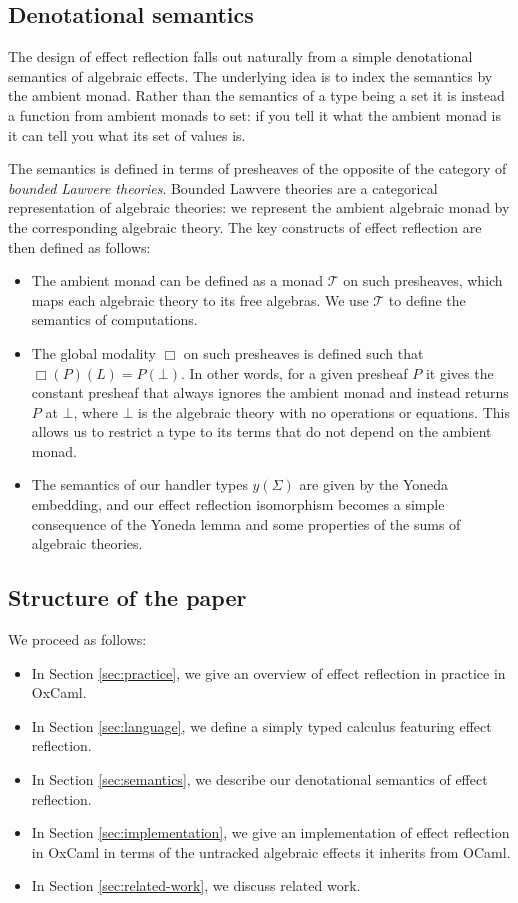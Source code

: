 \documentclass[acmsmall, screen, nonacm]{acmart}
\theoremstyle{definition}
\newcommand{\glob}{\mathop{\Box}}
\newcommand{\initial}{\bot}
\newcommand{\yoneda}[1]{y(#1)}
\newcommand{\mon}{\mathcal{T}}
\begin{document}
\subsection{Denotational semantics} The design of effect reflection falls
out naturally from a simple denotational semantics of algebraic
effects. The underlying idea is to index the semantics by the ambient
monad. Rather than the semantics of a type being a set it is instead a
function from ambient monads to set: if you tell it what the ambient
monad is it can tell you what its set of values is.

The semantics is defined in terms of presheaves of the opposite of the
category of \emph{bounded Lawvere theories}. Bounded Lawvere theories
are a categorical representation of algebraic theories: we represent the
ambient algebraic monad by the corresponding algebraic theory. The key
constructs of effect reflection are then defined as follows:

\begin{itemize}
\item The ambient monad can be defined as a monad $\mon$ on such
  presheaves, which maps each algebraic theory to its free algebras. We use
  $\mon$ to define the semantics of computations.

\item The global modality $\glob$ on such presheaves is defined such
  that $\glob(P)(L) = P(\initial)$. In other words, for a given presheaf
  $P$ it gives the constant presheaf that always ignores the ambient
  monad and instead returns $P$ at $\initial$, where $\initial$ is the
  algebraic theory with no operations or equations. This allows us to
  restrict a type to its terms that do not depend on the ambient monad.

\item The semantics of our handler types $\yoneda{\Sigma}$ are given by
  the Yoneda embedding, and our effect reflection isomorphism becomes a
  simple consequence of the Yoneda lemma and some properties of the sums
  of algebraic theories.
\end{itemize}

\subsection{Structure of the paper} We proceed as follows:
\begin{itemize}
\item In Section \ref{sec:practice}, we give an overview of effect reflection in
  practice in OxCaml.
\item In Section \ref{sec:language}, we define a simply typed calculus featuring
  effect reflection.
\item In Section \ref{sec:semantics}, we describe our denotational
  semantics of effect reflection.
\item In Section \ref{sec:implementation}, we give an implementation of effect
  reflection in OxCaml in terms of the untracked algebraic effects it
  inherits from OCaml.
\item In Section \ref{sec:related-work}, we discuss related work.
\end{itemize}
\end{document}
